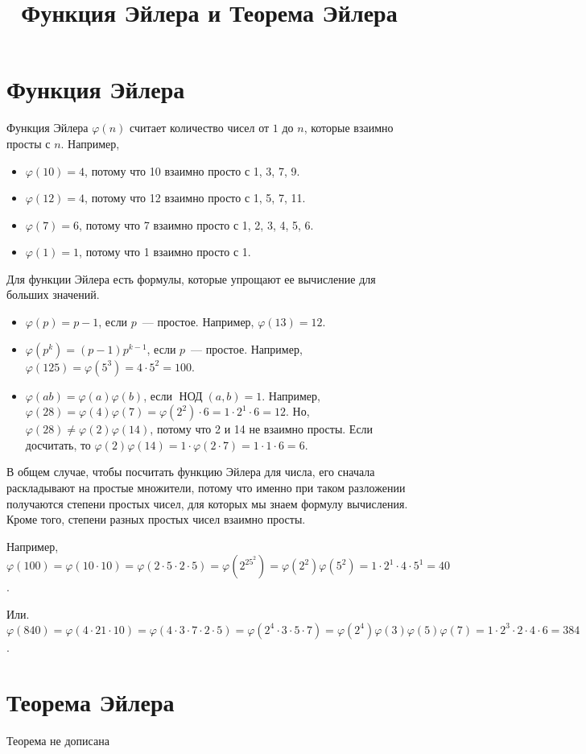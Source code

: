 \documentclass{article}
\title{Функция Эйлера и Теорема Эйлера}
\author{}
\date{}
\newcommand{\ephi}[1]{\varphi(#1)}
\begin{document}
    \maketitle

    \section{Функция Эйлера}
    Функция Эйлера $\ephi{n}$ считает количество чисел от $1$ до $n$, которые взаимно просты с $n$.
    Например,
    \begin{itemize}
        \item $\ephi{10}=4$, потому что 10 взаимно просто с 1, 3, 7, 9.
        \item $\ephi{12}=4$, потому что 12 взаимно просто с 1, 5, 7, 11.
        \item $\ephi7=6$, потому что 7 взаимно просто с 1, 2, 3, 4, 5, 6.
        \item $\ephi1=1$, потому что 1 взаимно просто с 1.
    \end{itemize}

    Для функции Эйлера есть формулы, которые упрощают ее вычисление для больших значений.

    \begin{itemize}
        \item $\ephi{p}=p-1$, если $p$~--- простое.
              Например, $\ephi{13}=12$.
        \item $\ephi{p^k}=(p-1)p^{k-1}$, если $p$~--- простое.
              Например, $\ephi{125}=\ephi{5^3}=4\cdot 5^2=100$.
        \item $\ephi{ab}=\ephi{a}\ephi{b}$, если $\mathop{\text{НОД}}(a, b)=1$.
              Например, $\ephi{28}=\ephi4\ephi7=\ephi{2^2}\cdot6=1\cdot2^1\cdot6=12$.
              Но, $\ephi{28}\ne\ephi{2}\ephi{14}$, потому что 2 и 14 не взаимно просты.
              Если досчитать, то $\ephi{2}\ephi{14}=1\cdot\ephi{2\cdot7}=1\cdot1\cdot6=6$.
    \end{itemize}

    В общем случае, чтобы посчитать функцию Эйлера для числа, его сначала раскладывают на простые множители, потому что именно при таком разложении получаются степени простых чисел, для которых мы знаем формулу вычисления. Кроме того, степени разных простых чисел взаимно просты.

    Например, $\ephi{100}=\ephi{10\cdot10}=\ephi{2\cdot5\cdot2\cdot5}=\ephi{2^25^2}=\ephi{2^2}\ephi{5^2}=
    1\cdot2^1\cdot4\cdot5^1=40$.

    Или. $\ephi{840}=\ephi{4\cdot21\cdot10}=\ephi{4\cdot3\cdot7\cdot2\cdot5}=\ephi{2^4\cdot3\cdot5\cdot7}=
    \ephi{2^4}\ephi3\ephi5\ephi7=1\cdot2^3\cdot2\cdot4\cdot6=384$.

    \section{Теорема Эйлера}
    Теорема не дописана
\end{document}
